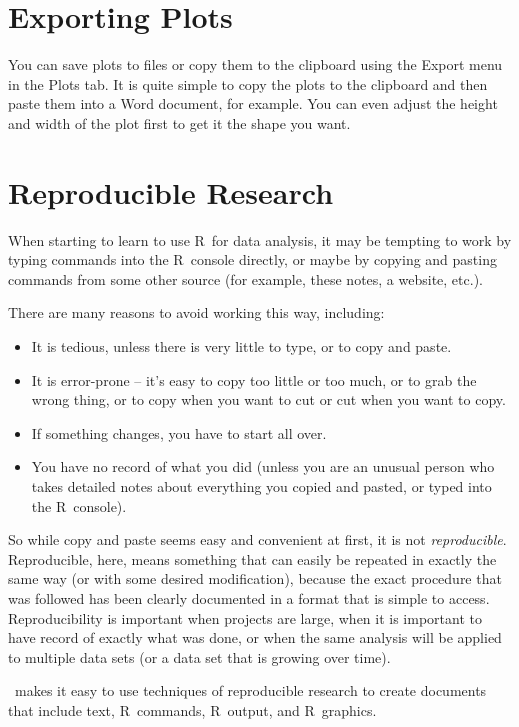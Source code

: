 \documentclass[twoside]{book}\usepackage[]{graphicx}\usepackage[]{xcolor}
\def\R{{\sf R}}
\def\tab#1{{\sf #1}}
\newcounter{example}[section]
\begin{document}
\section{Exporting Plots}

You can save plots to files or copy them to the clipboard using the 
\tab{Export} menu in the \tab{Plots} tab.  It is quite simple to copy the 
plots to the clipboard and then paste them into a Word document, for example.
You can even adjust the height and width of the plot first to get it the 
shape you want.

\section{Reproducible Research}

When starting to learn to use \R\ for data analysis, it may be tempting to work 
by typing commands into the \R\ console directly, or maybe by copying and pasting commands
from some other source (for example, these notes, a website, etc.).

There are many reasons to avoid working this way, including:
\begin{itemize}
	\item It is tedious, unless there is very little to type, or to copy and paste.
	\item It is error-prone -- it's easy to copy too little or too much, or to grab the wrong thing,
		or to copy when you want to cut or cut when you want to copy.
	\item
		If something changes, you have to start all over.
	\item
		You have no record of what you did (unless you are an unusual person who
		takes detailed notes about everything you copied and pasted, or typed into the \R\ console).
\end{itemize}
So while copy and paste seems easy and convenient at first, it is not \emph{reproducible}.  Reproducible, here,
means something that can easily be repeated in exactly the same way (or with some desired modification), because
the exact procedure that was followed has been clearly documented in a format that is simple to access.
Reproducibility is important when projects are large, when it is important to have record of 
exactly what was done, or when the same analysis will be applied to multiple data sets (or a data set
that is growing over time).

\RStudio\ makes it easy to use techniques of reproducible research to create
documents that include text, \R\ commands, \R\ output, and \R\ graphics.  
\end{document}
